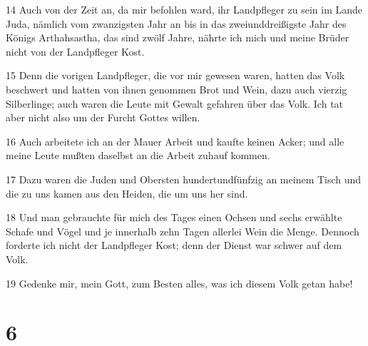 \par 14 Auch von der Zeit an, da mir befohlen ward, ihr Landpfleger zu sein im Lande Juda, nämlich vom zwanzigsten Jahr an bis in das zweiunddreißigste Jahr des Königs Arthahsastha, das sind zwölf Jahre, nährte ich mich und meine Brüder nicht von der Landpfleger Kost.
\par 15 Denn die vorigen Landpfleger, die vor mir gewesen waren, hatten das Volk beschwert und hatten von ihnen genommen Brot und Wein, dazu auch vierzig Silberlinge; auch waren die Leute mit Gewalt gefahren über das Volk. Ich tat aber nicht also um der Furcht Gottes willen.
\par 16 Auch arbeitete ich an der Mauer Arbeit und kaufte keinen Acker; und alle meine Leute mußten daselbst an die Arbeit zuhauf kommen.
\par 17 Dazu waren die Juden und Obersten hundertundfünfzig an meinem Tisch und die zu uns kamen aus den Heiden, die um uns her sind.
\par 18 Und man gebrauchte für mich des Tages einen Ochsen und sechs erwählte Schafe und Vögel und je innerhalb zehn Tagen allerlei Wein die Menge. Dennoch forderte ich nicht der Landpfleger Kost; denn der Dienst war schwer auf dem Volk.
\par 19 Gedenke mir, mein Gott, zum Besten alles, was ich diesem Volk getan habe!

\chapter{6}

